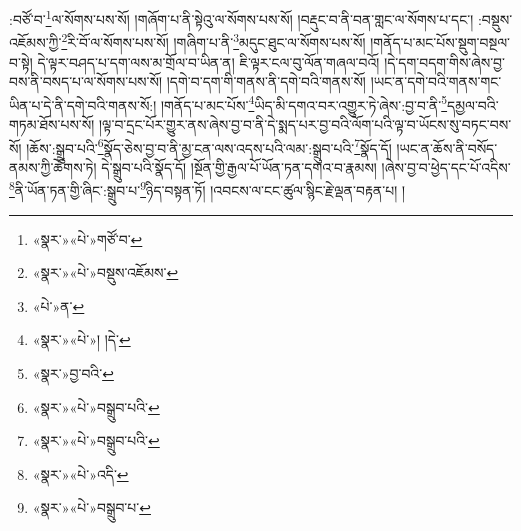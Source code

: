 :བཙོ་བ་\footnote{«སྣར་»«པེ་»གཙོ་བ་}ལ་སོགས་པས་སོ། །གཞོག་པ་ནི་སྟེའུ་ལ་སོགས་པས་སོ། །བརྡུང་བ་ནི་བན་གླང་ལ་སོགས་པ་དང་། :བསྡུས་འཇོམས་ཀྱི་\footnote{«སྣར་»«པེ་»བསྡུས་འཇོམས་}རི་བོ་ལ་སོགས་པས་སོ། །གཞིག་པ་ནི་\footnote{«པེ་»ན་}མདུང་ཐུང་ལ་སོགས་པས་སོ། །གནོད་པ་མང་པོས་སྡུག་བསྔལ་བ་སྟེ། དེ་ལྟར་བཤད་པ་དག་ལས་མ་གྲོལ་བ་ཡིན་ན། ཇི་ལྟར་ངལ་བུ་ལོན་གཞལ་བའོ། །དེ་དག་བདག་གིས་ཞེས་བྱ་བས་ནི་བསད་པ་ལ་སོགས་པས་སོ། །དགེ་བ་དག་གི་གནས་ནི་དགེ་བའི་གནས་སོ། །ཡང་ན་དགེ་བའི་གནས་གང་ཡིན་པ་དེ་ནི་དགེ་བའི་གནས་སོ:། །གནོད་པ་མང་པོས་\footnote{«སྣར་»«པེ་»། །དེ་}ཡིད་མི་དགའ་བར་འགྱུར་ཏེ་ཞེས་:བྱ་བ་ནི་\footnote{«སྣར་»བྱ་བའི་}དམྱལ་བའི་གཏམ་ཐོས་པས་སོ། །ལྟ་བ་དྲང་པོར་གྱུར་ནས་ཞེས་བྱ་བ་ནི་དེ་སྨད་པར་བྱ་བའི་ལོག་པའི་ལྟ་བ་ཡོངས་སུ་བཏང་བས་སོ། །ཆོས་:སྒྲུབ་པའི་\footnote{«སྣར་»«པེ་»བསྒྲུབ་པའི་}སྣོད་ཅེས་བྱ་བ་ནི་མྱ་ངན་ལས་འདས་པའི་ལམ་:སྒྲུབ་པའི་\footnote{«སྣར་»«པེ་»བསྒྲུབ་པའི་}སྣོད་དོ། །ཡང་ན་ཆོས་ནི་བསོད་ནམས་ཀྱི་ཆོགས་ཏེ། དེ་སྒྲུབ་པའི་སྣོད་དོ། །སྔོན་གྱི་རྒྱལ་པོ་ཡོན་ཏན་དགའ་བ་རྣམས། །ཞེས་བྱ་བ་ཕྱེད་དང་པོ་འདིས་\footnote{«སྣར་»«པེ་»འདི་}ནི་ཡོན་ཏན་གྱི་ཞིང་:སྒྲུབ་པ་\footnote{«སྣར་»«པེ་»བསྒྲུབ་པ་}ཉིད་བསྟན་ཏོ། །འབངས་ལ་ངང་ཚུལ་སྙིང་རྗེ་ལྡན་བརྟན་པ། །
